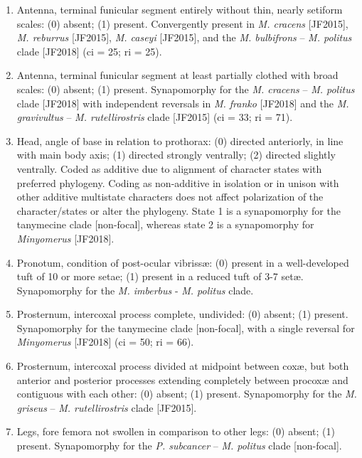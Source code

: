 \documentclass[fleqn,10pt,lineno]{wlpeerj} %
\begin{document}
\begin{enumerate}
	 	\item Antenna, terminal funicular segment entirely without thin, nearly setiform scales: (0) absent; (1) present. Convergently present in \textit{M. cracens} [JF2015], \textit{M. reburrus} [JF2015], \textit{M. caseyi} [JF2015], and the \textit{M. bulbifrons} – \textit{M. politus} clade [JF2018] (ci = 25; ri = 25).
	 	
	 	\item Antenna, terminal funicular segment at least partially clothed with broad scales: (0) absent; (1) present. Synapomorphy for the \textit{M. cracens} – \textit{M. politus} clade [JF2018] with independent reversals in \textit{M. franko} [JF2018] and the \textit{M. gravivultus} – \textit{M. rutellirostris} clade [JF2015] (ci = 33; ri = 71).
	 	
	 	\item Head, angle of base in relation to prothorax: (0) directed anteriorly, in line with main body axis; (1) directed strongly ventrally; (2) directed slightly ventrally. Coded as additive due to alignment of character states with preferred phylogeny. Coding as non-additive in isolation or in unison with other additive multistate characters does not affect polarization of the character/states or alter the phylogeny. State 1 is a synapomorphy for the tanymecine clade [non-focal], whereas state 2 is a synapomorphy for \textit{Minyomerus} [JF2018].
	 	
	 	\item Pronotum, condition of post-ocular vibriss{\ae}: (0) present in a well-developed tuft of 10 or more setae; (1) present in a reduced tuft of 3-7 set{\ae}. Synapomorphy for the \textit{M. imberbus} - \textit{M. politus} clade.
	 	
	 	\item Prosternum, intercoxal process complete, undivided: (0) absent; (1) present. Synapomorphy for the tanymecine clade [non-focal], with a single reversal for \textit{Minyomerus} [JF2018] (ci = 50; ri = 66).
	 	
	 	\item Prosternum, intercoxal process divided at midpoint between cox{\ae}, but both anterior and posterior processes extending completely between procox{\ae} and contiguous with each other: (0) absent; (1) present. Synapomorphy for the \textit{M. griseus} – \textit{M. rutellirostris} clade [JF2015].
	 	
	 	\item Legs, fore femora not swollen in comparison to other legs: (0) absent; (1) present. Synapomorphy for the \textit{P. subcancer} – \textit{M. politus} clade [non-focal].
	 	

\end{enumerate}
\end{document}
